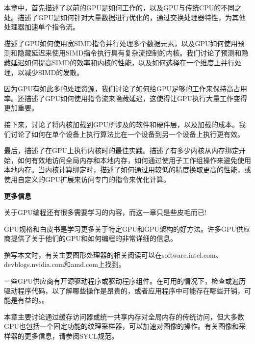
本章中，首先描述了以前的GPU是如何工作的，以及GPU与传统CPU的不同之处。描述了GPU是如何针对大量数据进行优化的，通过交换处理器特性，为其他处理器加速单个指令流。\par

描述了GPU如何使用宽SIMD指令并行处理多个数据元素，以及GPU如何使用预测和隐藏延迟来使用SIMD指令执行具有复杂流控制的内核。我们讨论了预测和隐藏延迟如何提高SIMD的效率和内核的性能，以及如何选择在一个维度上并行处理，以减少SIMD的发散。\par

因为GPU有如此多的处理资源，我们讨论了如何给GPU足够的工作来保持高占用率。还描述了GPU如何使用指令流来隐藏延迟，这使得让GPU执行大量工作变得更加重要。\par

接下来，讨论了将内核加载到GPU所涉及的软件和硬件层，以及加载的成本。我们讨论了如何在单个设备上执行算法比在一个设备到另一个设备上执行更有效。\par

最后，描述了在GPU上执行内核时的最佳实践。描述了有多少内核从内存绑定开始，如何有效地访问全局内存和本地内存，如何通过使用子工作组操作来避免使用本地内存。当内核计算绑定时，描述了如何通过用较低的精度换取更高的性能，或使用自定义的GPU扩展来访问专门的指令来优化计算。\par

\hspace*{\fill} \par %
\textbf{更多信息}

关于GPU编程还有很多需要学习的内容，而这一章只是些皮毛而已!\par

GPU规格和白皮书是学习更多关于特定GPU和GPU架构的好方法。许多GPU供应商提供了关于他们的GPU和如何编程的非常详细的信息。\par

撰写本文时，有关主要图形处理器的相关阅读可以在software.intel.com、devblogs.nvidia.com和amd.com上找到。\par

一些GPU供应商有开源驱动程序或驱动程序组件。在可用的情况下，检查或遍历驱动程序代码，以了解哪些操作是昂贵的，或者应用程序中可能存在哪些开销，可能是有益的。。\par

本章主要讨论通过缓存访问器或统一共享内存对全局内存的传统访问，但大多数GPU也包括一个固定功能的纹理采样器，可以加速对图像的操作。有关图像和采样器的更多信息，请参阅SYCL规范。\par

\newpage